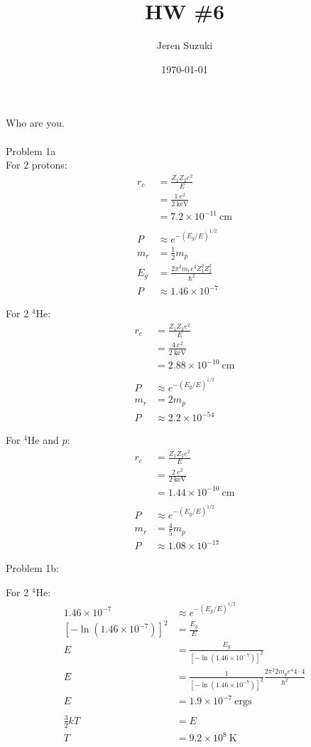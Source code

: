 \documentclass[10pt,a4paper,preprint]{aastex}
\begin{document}
\title{HW \#6}
\author{\begin{large}Jeren Suzuki\end{large}}
\author{\today}

Who are you.\\
\\
Problem 1a\\

For 2 protons:
\begin{align}
r_c & = \frac{Z_1 Z_2 e^2}{E}\\
& = \frac{1~e^2}{2 ~\text{keV}}\\
& = 7.2 \times 10^{-11}~\text{cm}\\
\\
P & \approx e^{-(E_g/E)^{1/2}}\\
m_r & = \frac{1}{2}m_p\\
E_g & = \frac{2 \pi^2 m_r e^4 Z_1^2 Z_2^2}{\hbar^2}\\
P & \approx 1.46 \times 10^{-7}
\end{align}

For 2 $^4$He:
\begin{align}
r_c & = \frac{Z_1 Z_2 e^2}{E}\\
& = \frac{4~e^2}{2 ~\text{keV}}\\
& = 2.88 \times 10^{-10}~\text{cm}\\
\\
P & \approx e^{-(E_g/E)^{1/2}}\\
m_r & = 2 m_p\\
P & \approx 2.2 \times 10^{-54} 
\end{align}

For $^4$He and $p$:
\begin{align}
r_c & = \frac{Z_1 Z_2 e^2}{E}\\
& = \frac{2~e^2}{2 ~\text{keV}}\\
& = 1.44 \times 10^{-10}~\text{cm}\\
\\
P & \approx e^{-(E_g/E)^{1/2}}\\
m_r & = \frac{4}{5}m_p\\
P & \approx 1.08 \times 10^{-17}
\end{align}

Problem 1b:

For 2 $^4$He:
\begin{align}
1.46 \times 10^{-7} & \approx e^{-(E_g/E)^{1/2}}\\
[-\ln (1.46 \times 10^{-7})]^2 & = \frac{E_g}{E}\\
E & = \frac{E_g}{[-\ln (1.46 \times 10^{-7})]^2}\\
E & = \frac{1}{[-\ln (1.46 \times 10^{-7})]^2}\frac{2 \pi^2 2 m_p e^4 4 \cdot 4}{\hbar^2}\\
E & = 1.9 \times 10^{-7} ~\text{ergs}\\
\\
\frac{3}{2}kT & = E \\
T &=  9.2 \times 10^{8}~\text{K}
\end{align}
\end{document}
